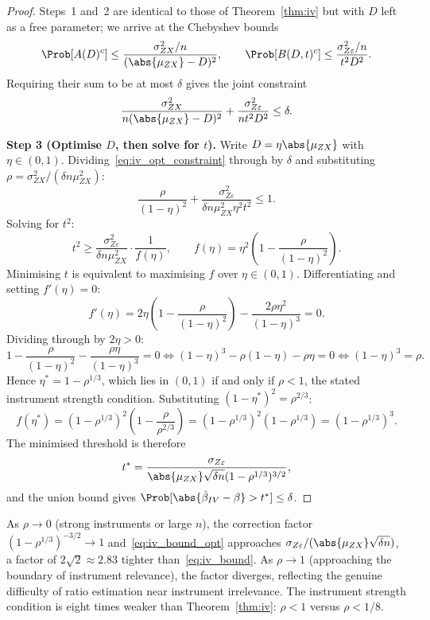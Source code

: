 \begin{proof}
    Steps~1 and~2 are identical to those of Theorem~\ref{thm:iv} but with $D$ left as a free parameter; we arrive at the Chebyshev bounds
    \[
        \Prob[A(D)^c] \leq \frac{\sigma_{ZX}^2/n}{(\abs{\mu_{ZX}}-D)^2}, \qquad \Prob[B(D,t)^c] \leq \frac{\sigma_{Z\varepsilon}^2/n}{t^2 D^2}.
    \]
    Requiring their sum to be at most $\delta$ gives the joint constraint
    \begin{equation}
    \label{eq:iv_opt_constraint}
        \frac{\sigma_{ZX}^2}{n(\abs{\mu_{ZX}}-D)^2} + \frac{\sigma_{Z\varepsilon}^2}{n t^2 D^2} \leq \delta.
    \end{equation}

    \medskip\noindent\textbf{Step 3 (Optimise $D$, then solve for $t$).}
    Write $D = \eta\abs{\mu_{ZX}}$ with $\eta\in(0,1)$. Dividing~\eqref{eq:iv_opt_constraint} through by $\delta$ and substituting $\rho = \sigma_{ZX}^2/(\delta n\mu_{ZX}^2)$:
    \[
        \frac{\rho}{(1-\eta)^2} + \frac{\sigma_{Z\varepsilon}^2}{\delta n\mu_{ZX}^2\eta^2 t^2} \leq 1.
    \]
    Solving for $t^2$:
    \[
        t^2 \geq
        \frac{\sigma_{Z\varepsilon}^2}{\delta n\mu_{ZX}^2}
        \cdot \frac{1}{f(\eta)},
        \qquad
        f(\eta) = \eta^2\!\left(1 - \frac{\rho}{(1-\eta)^2}\right).
    \]
    Minimising $t$ is equivalent to maximising $f$ over $\eta\in(0,1)$. Differentiating and setting $f'(\eta)=0$:
    \[
        f'(\eta) = 2\eta\!\left(1 - \frac{\rho}{(1-\eta)^2}\right) - \frac{2\rho\eta^2}{(1-\eta)^3} = 0.
    \]
    Dividing through by $2\eta > 0$:
    \[
        1 - \frac{\rho}{(1-\eta)^2} - \frac{\rho\eta}{(1-\eta)^3} = 0 \iff (1-\eta)^3 - \rho(1-\eta) - \rho\eta = 0 \iff (1-\eta)^3 = \rho.
    \]
    Hence $\eta^* = 1 - \rho^{1/3}$, which lies in $(0,1)$ if and only if $\rho < 1$, the stated instrument strength condition. Substituting $(1-\eta^*)^2 = \rho^{2/3}$:
    \[
        f(\eta^*) = (1-\rho^{1/3})^2\!\left(1 - \frac{\rho}{\rho^{2/3}}\right) = (1-\rho^{1/3})^2(1 - \rho^{1/3}) = (1-\rho^{1/3})^3.
    \]
    The minimised threshold is therefore
    \[
        t^* = \frac{\sigma_{Z\varepsilon}}{\abs{\mu_{ZX}}\sqrt{\delta n}(1-\rho^{1/3})^{3/2}},
    \]
    and the union bound gives $\Prob[\abs{\hat\beta_{IV}-\beta}>t^*]\leq\delta$.
\end{proof}

\begin{remark}
\label{rem:iv_opt_compare}
    As $\rho\to 0$ (strong instruments or large $n$), the correction factor $(1-\rho^{1/3})^{-3/2}\to 1$ and~\eqref{eq:iv_bound_opt} approaches $\sigma_{Z\varepsilon}/(\abs{\mu_{ZX}}\sqrt{\delta n})$, a factor of $2\sqrt{2}\approx 2.83$ tighter than~\eqref{eq:iv_bound}. As $\rho\to 1$ (approaching the boundary of instrument relevance), the factor diverges, reflecting the genuine difficulty of ratio estimation near instrument irrelevance. The instrument strength condition is eight times weaker than Theorem~\ref{thm:iv}: $\rho < 1$ versus $\rho < 1/8$.
\end{remark}


